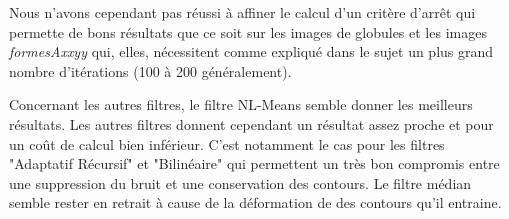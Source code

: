 \documentclass[a4,12pt]{article}
\begin{document}
Nous n'avons cependant pas réussi à affiner le calcul d'un critère d'arrêt qui permette de bons résultats que ce soit sur les images de globules et les images \textit{formesAxxyy} qui, elles, nécessitent comme expliqué dans le sujet un plus grand nombre d'itérations (100 à 200 généralement).


Concernant les autres filtres, le filtre NL-Means semble donner les meilleurs résultats. Les autres filtres donnent cependant un résultat assez proche et pour un coût de calcul bien inférieur. C'est notamment le cas pour les filtres "Adaptatif Récursif" et "Bilinéaire" qui permettent un très bon compromis entre une suppression du bruit et une conservation des contours. Le filtre médian semble rester en retrait à cause de la déformation de des contours qu'il entraine.

\end{document}
